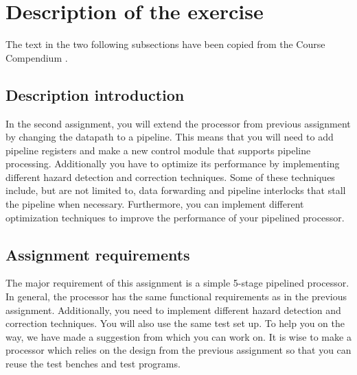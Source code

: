 \section{Description of the exercise}

The text in the two following subsections have been copied from the Course
Compendium \cite{compendium}.

\subsection{Description introduction}

In the second assignment, you will extend the processor from previous
assignment by changing the datapath to a pipeline. This means that you will need
to add pipeline registers and make a new control module that supports pipeline
processing. Additionally you have to optimize its performance by implementing
diﬀerent hazard detection and correction techniques. Some of these techniques
include, but are not limited to, data forwarding and pipeline interlocks that
stall the pipeline when necessary. Furthermore, you can implement different
optimization techniques to improve the performance of your pipelined processor.

\subsection{Assignment requirements}

The major requirement of this assignment is a simple 5-stage pipelined
processor. In general, the processor has the same functional requirements as in
the previous assignment. Additionally, you need to implement diﬀerent hazard
detection and correction techniques. You will also use the same test set up. To
help you on the way, we have made a suggestion from which you can work on. It is
wise to make a processor which relies on the design from the previous assignment
so that you can reuse the test benches and test programs.
